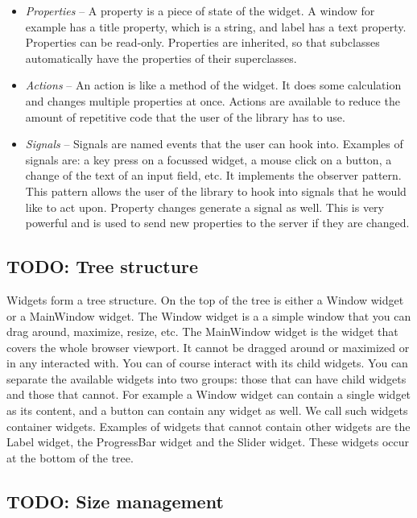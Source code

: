 \documentclass[11pt,a4paper]{article}
\begin{document}
\begin{itemize}
\item \textit{Properties} -- A property is a piece of state of the widget.
A window for example has a title property, which is a string, and label has a text property.
Properties can be read-only.
Properties are inherited, so that subclasses automatically have the properties of their superclasses.

\item \textit{Actions} -- An action is like a method of the widget.
It does some calculation and changes multiple properties at once.
Actions are available to reduce the amount of repetitive code that the user of the library has to use.

\item \textit{Signals} -- Signals are named events that the user can hook into.
Examples of signals are: a key press on a focussed widget, a mouse click on a button, a change of the text of an input field, etc.
It implements the observer pattern.
This pattern allows the user of the library to hook into signals that he would like to act upon.
Property changes generate a signal as well.
This is very powerful and is used to send new properties to the server if they are changed.
\end{itemize}

\subsection{TODO: Tree structure}



Widgets form a tree structure.
On the top of the tree is either a Window widget or a MainWindow widget.
The Window widget is a a simple window that you can drag around, maximize, resize, etc.
The MainWindow widget is the widget that covers the whole browser viewport.
It cannot be dragged around or maximized or in any interacted with.
You can of course interact with its child widgets.
You can separate the available widgets into two groups: those that can have child widgets and those that cannot.
For example a Window widget can contain a single widget as its content, and a button can contain any widget as well.
We call such widgets container widgets.
Examples of widgets that cannot contain other widgets are the Label widget, the ProgressBar widget and the Slider widget.
These widgets occur at the bottom of the tree.




\subsection{TODO: Size management}
\end{document}
